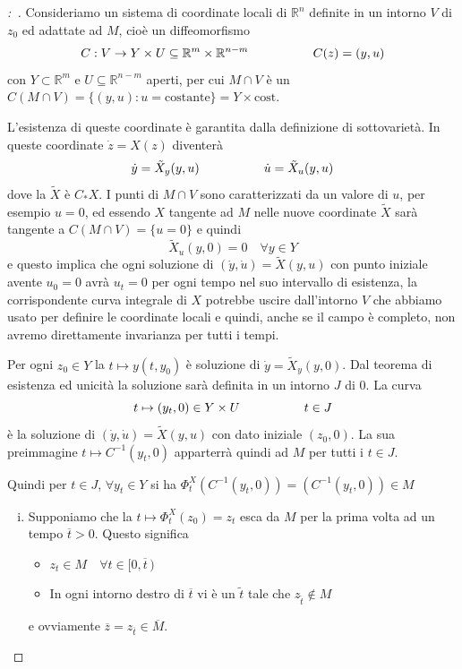 \documentclass[11pt,a4paper,twoside]{book}
\newenvironment{dimo}[1][\proofname]{
	\begin{tcolorbox}[
	breakable, 
	enhanced, 
	interior hidden, 
	frame hidden, 
	borderline west = {1pt}{0pt}{gray}, 
	top=0pt, bottom=0pt, left=0pt]
\begin{proof}[#1:~]
}
{
\end{proof}
\end{tcolorbox}
}
\theoremstyle{esss}
\theoremstyle{dotless}
\numberwithin{equation}{section} %
\begin{document}
\begin{dimo}
Consideriamo un sistema di coordinate locali di $\mathbb{R}^n$ definite in un intorno $V$ di $z_0$ ed adattate ad $M$, cioè un diffeomorfismo
\[
C:V\rightarrow Y\times U \subseteq \mathbb{R}^m\times\mathbb{R}^{n-m} \hspace{0.15\linewidth} C(z)=(y,u)
\]
con $Y\subset\mathbb{R}^m$ e $U\subseteq\mathbb{R}^{n-m}$ aperti, per cui $M\cap V$ è un $C(M\cap V)=\{(y,u):u =\text{costante}\}=Y\times \text{cost}$.

L'esistenza di queste coordinate è garantita dalla definizione di sottovarietà.\footnotemark
In queste coordinate $\dot{z}=X(z)$ diventerà
\[
\dot{y}=\tilde{X}_y(y,u) \hspace{0.15\linewidth} \dot{u}=\tilde{X}_u(y,u)
\]
dove la $\tilde{X}$ è $C_*X$. 
I punti di $M\cap V$ sono caratterizzati da un valore di $u$, per esempio $u=0$, ed essendo $X$ tangente ad $M$ nelle nuove coordinate $\tilde{X}$ sarà tangente a $C(M\cap V)=\{u=0\}$ e quindi
\[
\tilde{X}_u(y,0)=0 \quad \forall y\in Y
\]
e questo implica che ogni soluzione di $\left(\dot{y},\dot{u}\right)=\tilde{X}(y,u)$ con punto iniziale avente $u_0=0$ avrà $u_t=0$ per ogni tempo nel suo intervallo di esistenza, la corrispondente curva integrale di $X$ potrebbe uscire dall'intorno $V$ che abbiamo usato per definire le coordinate locali e quindi, anche se il campo è completo, non avremo direttamente invarianza per tutti i tempi.\par 

Per ogni $z_0\in Y$ la $t\mapsto y(t,y_0)$ è soluzione di $\dot{y}=\tilde{X}_y(y,0)$. Dal teorema di esistenza ed unicità la soluzione sarà definita in un intorno $J$ di $0$. 
La curva
\[
t\mapsto (y_t,0) \in Y\times U \hspace{0.15\linewidth} t\in J
\]
è la soluzione di $\left(\dot{y},\dot{u}\right)=\tilde{X}(y,u)$ con dato iniziale $(z_0,0)$.
La sua preimmagine $t\mapsto C^{-1}(y_t,0)$ apparterrà quindi ad $M$ per tutti i $t\in J$.

Quindi per $t\in J$, $\forall y_t \in Y$ si ha $\Phi_t^X\left(C^{-1}(y_t,0)\right)=\left(C^{-1}(y_t,0)\right)\in M$
\begin{enumerate}[i.]
\item Supponiamo che la $t\mapsto\Phi_{t}^X(z_0)=z_t$ esca da $M$ per la prima volta ad un tempo $\overline{t}>0$. Questo significa 
\begin{itemize}
\item $z_t\in M \quad \forall t\in [0,\overline{t}\, )$
\item In ogni intorno destro di $\overline{t}$ vi è un $\tilde{t}$ tale che $z_{\tilde{t}} \not\in M$
\end{itemize}
e ovviamente $\overline{z}=z_{\overline{t}}\in\overline{M}$.


\end{enumerate}
\end{dimo}
\end{document}
